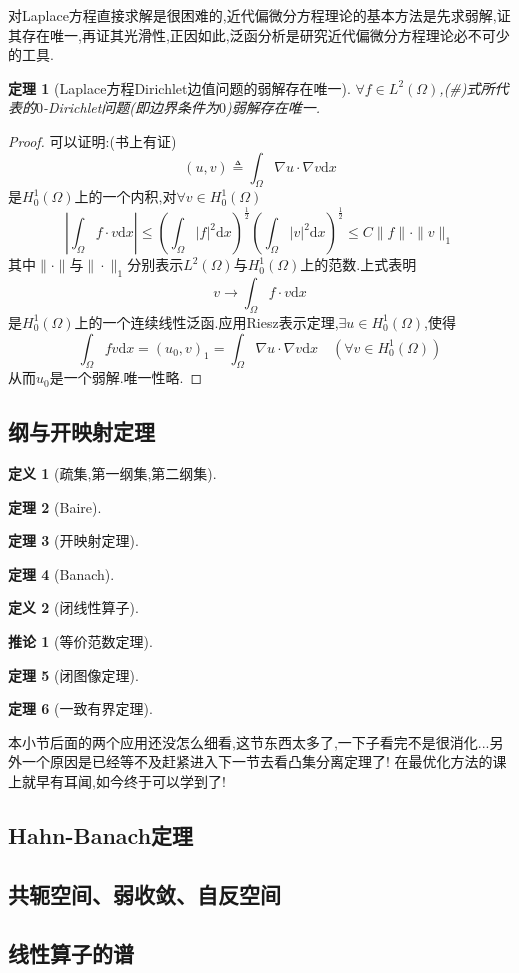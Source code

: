 \documentclass[12pt,a4paper]{article}
\newtheorem{thm}{定理}[subsection]  %
\newtheorem{corollary}{推论}[subsection] %
\newtheorem{definition}{定义}[subsection] %
\begin{document}
对Laplace方程直接求解是很困难的,近代偏微分方程理论的基本方法是先求弱解,证其存在唯一,再证其光滑性,正因如此,泛函分析是研究近代偏微分方程理论必不可少的工具.
\begin{thm}[Laplace方程Dirichlet边值问题的弱解存在唯一]
    $\forall f \in L^2(\Omega)$,(\#)式所代表的$0$-Dirichlet问题(即边界条件为$0$)弱解存在唯一.
\end{thm}
\begin{proof}
    可以证明:(书上有证)\[(u,v) \triangleq \int_{\Omega} \nabla u \cdot \nabla v \mathrm{d}x\]
    是$H_0^1(\Omega)$上的一个内积,对$\forall v \in H_0^1(\Omega)$
    \[|\int_{\Omega}f\cdot v \mathrm{d}x|\leq (\int_{\Omega}|f|^2\mathrm{d}x)^{\frac{1}{2}} (\int_{\Omega}|v|^2\mathrm{d}x)^{\frac{1}{2}}
    \leq C \|f\|\cdot \|v\|_1\]
    其中$\|\cdot\|$与$\|\cdot\|_1$分别表示$L^2(\Omega)$与$H_0^1(\Omega)$上的范数.上式表明
    \[v \to \int_{\Omega}f\cdot v \mathrm{d}x\]
    是$H_0^1(\Omega)$上的一个连续线性泛函.应用Riesz表示定理,$\exists u \in H_0^1(\Omega)$,使得
    \[\int_{\Omega}fv\mathrm{d}x = (u_0,v)_1 = \int_{\Omega}\nabla u \cdot \nabla v\mathrm{d}x\quad (\forall v \in H_0^1(\Omega))\]
    从而$u_0$是一个弱解.唯一性略.
\end{proof}
\subsection{纲与开映射定理}
\begin{definition}[疏集,第一纲集,第二纲集]
\end{definition}
\begin{thm}[Baire]
\end{thm}
\begin{thm}[开映射定理]
\end{thm}
\begin{thm}[Banach]
\end{thm}
\begin{definition}[闭线性算子]
\end{definition}
\begin{corollary}[等价范数定理]
\end{corollary}
\begin{thm}[闭图像定理]
\end{thm}
\begin{thm}[一致有界定理]
\end{thm}
本小节后面的两个应用还没怎么细看,这节东西太多了,一下子看完不是很消化...另外一个原因是已经等不及赶紧进入下一节去看凸集分离定理了!
在最优化方法的课上就早有耳闻,如今终于可以学到了!
\subsection{Hahn-Banach定理}
\subsection{共轭空间、弱收敛、自反空间}
\subsection{线性算子的谱}
\end{document}
